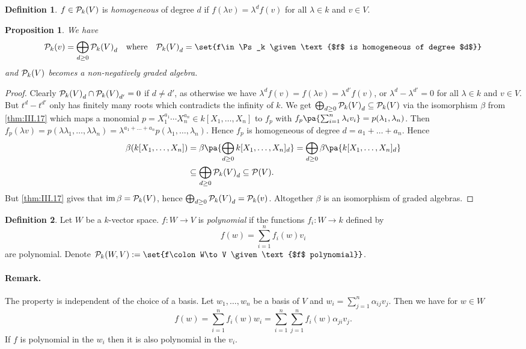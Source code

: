 \documentclass[12pt,a4paper]{scrartcl}
\theoremstyle{cplain}
\theoremstyle{cplain}
\theoremstyle{cplain}
\newtheorem{prop}[thmcounter]{Proposition}
\theoremstyle{definition}
\newtheorem*{deff}{Definition}
\begin{document}
\begin{otherlanguage}{english}
\begin{deff}
  $f\in \mathcal{P}_k(V)$ is \emph{homogeneous} of degree $d$ if $f(\lambda v) = \lambda^df(v)$ for all $\lambda \in k$ and $v\in V$.
\end{deff}

\begin{prop}
  We have \[ \Ps_k(v) = \bigoplus_{d\ge0}{\Ps_k(V)}_d \quad\text{where}\quad {\Ps_k(V)}_d = \set{f\in \Ps_k \given \text{$f$ is homogeneous of degree $d$}} \] and $\mathcal{P}_k(V)$ becomes a non-negatively graded algebra.
\end{prop}
\begin{proof}
  Clearly ${\mathcal{P}_k(V)}_d \cap {\mathcal{P}_k(V)}_{d'} = 0$ if $d \neq d'$, as otherwise we have $\lambda^df(v) = f(\lambda v) = \lambda^{d'}f(v)$, or $\lambda^d - \lambda^{d'}=0$ for all $\lambda \in k$ and $v \in V$. But $t^d -t^{d'}$ only has finitely many roots which contradicts the infinity of $k$. We get $\bigoplus_{d\ge0}{\mathcal{P}_k(V)}_d \subseteq \mathcal{P}_k(V)$ via the isomorphism $\beta $ from \cref{thm:III.17} which maps a monomial $p = X_1^{a_1}\cdots X_n^{a_n} \in k[X_1,\ldots,X_n]$ to $f_p$ with $f_p\pa{\sum_{i=1}^n\lambda_iv_i} = p(\lambda_1,\lambda_n)$. Then $f_p(\lambda v) = p(\lambda\lambda_1,\ldots,\lambda\lambda_n) = \lambda^{a_1+\ldots+a_n}p(\lambda_1,\ldots,\lambda_n)$. Hence $f_p$ is homogeneous of degree $d = a_1+\dots+a_n$. Hence \begin{align*} \beta(k[X_1,\ldots,X_n]) &= \beta\pa{\bigoplus_{d\ge 0} k[X_1,\ldots,X_n]_d} = \bigoplus_{d\ge 0}\beta\pa{k[X_1,\ldots,X_n]_d} \\ &\subseteq \bigoplus_{d\ge0}{\Ps_k(V)}_d \subseteq \Ps(V). \end{align*} But \cref{thm:III.17} gives that $\operatorname{im} \beta = \mathcal{P}_k(V)$, hence $\bigoplus_{d\ge0}{\mathcal{P}_k(V)}_d = \mathcal{P}_k(v)$. Altogether $\beta$ is an isomorphism of graded algebras.
\end{proof}

\begin{deff}
  Let $W$ be a $k$-vector space. $f\colon W\to V$ is \emph{polynomial} if the functions $f_i\colon W \to k$ defined by \[f(w) = \sum_{i=1}^nf_i(w)v_i \] are polynomial. Denote $\Ps_k(W,V) := \set{f\colon W\to V \given\text{$f$ polynomial}}$.
\end{deff}

\paragraph{Remark.}
The property is independent of the choice of a basis. Let $w_1,\ldots,w_n$ be a basis of $V$ and $w_i = \sum_{j=1}^n\alpha_{ij}v_j$. Then we have for $w \in W$ \[ f(w) = \sum_{i=1}^n f_i(w) w_i = \sum_{i=1}^n\sum_{j=1}^n f_i(w)\alpha_{ji}v_j. \]
If $f$ is polynomial in the $w_i$ then it is also polynomial in the $v_i$.


\end{otherlanguage}
\end{document}
